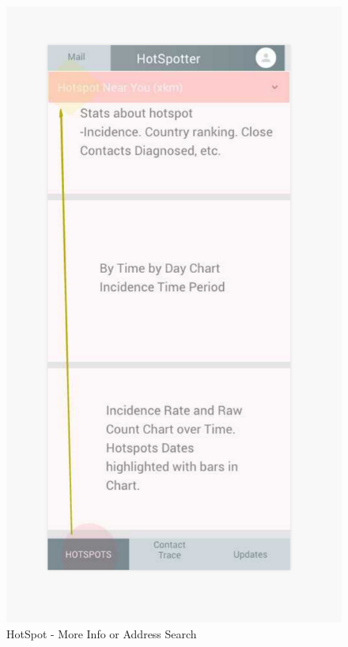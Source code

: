 \documentclass{scrreprt}
\begin{document}
\begin{figure}[H]
	\centering
	\includegraphics[page=1, width=0.9\linewidth]{COMP30830-HotSpot-MoreInfo}
	\caption{HotSpot - More Info or Address Search}
	\label{MoreInoHot}
\end{figure}
\end{document}
